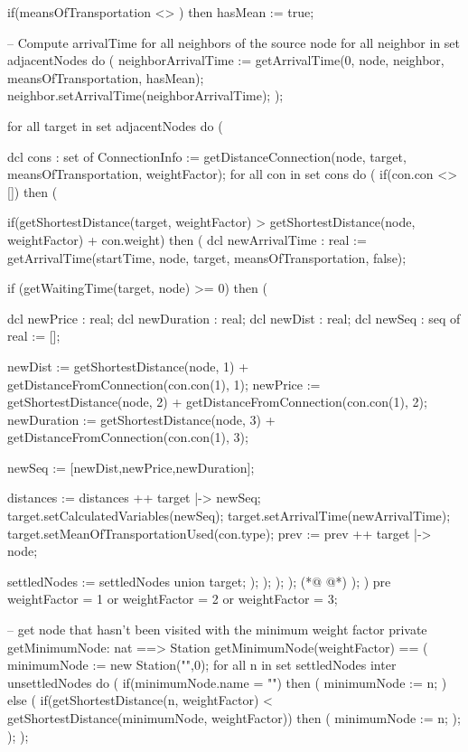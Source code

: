 \begin{vdmpp}[breaklines=true]
  if(meansOfTransportation <> {}) then
    hasMean := true;
    
  -- Compute arrivalTime for all neighbors of the source node
  for all neighbor in set adjacentNodes do (
   neighborArrivalTime := getArrivalTime(0, node, neighbor, meansOfTransportation, hasMean);
   neighbor.setArrivalTime(neighborArrivalTime);
  );

  for all target in set adjacentNodes do (
  
   dcl cons : set of ConnectionInfo := getDistanceConnection(node, target, meansOfTransportation, weightFactor);
   for all con in set cons do (
    if(con.con <> []) then (
    
     if(getShortestDistance(target, weightFactor) > getShortestDistance(node, weightFactor) + con.weight) then (
      dcl newArrivalTime : real := getArrivalTime(startTime, node, target, meansOfTransportation, false);
  
      if (getWaitingTime(target, node) >= 0) then (
      
       dcl newPrice : real;
       dcl newDuration : real;
       dcl newDist : real;
       dcl newSeq : seq of real := [];
      
       newDist := getShortestDistance(node, 1) + getDistanceFromConnection(con.con(1), 1); 
       newPrice := getShortestDistance(node, 2) + getDistanceFromConnection(con.con(1), 2);
       newDuration := getShortestDistance(node, 3) + getDistanceFromConnection(con.con(1), 3); 
      
       newSeq := [newDist,newPrice,newDuration];
       
       distances := distances ++ {target |-> newSeq};
       target.setCalculatedVariables(newSeq);
       target.setArrivalTime(newArrivalTime);
       target.setMeanOfTransportationUsed(con.type);
       prev := prev ++ {target |-> node};
       
       settledNodes := settledNodes union {target}; 
      );
     );
    );
   );
(*@
\label{getMinimumNode:182}
@*)
  );
 )
 pre weightFactor = 1 or weightFactor = 2 or weightFactor = 3;
 
 -- get node that hasn't been visited with the minimum weight factor
 private getMinimumNode: nat ==> Station 
 getMinimumNode(weightFactor) == 
 (
  minimumNode := new Station("",0);
  for all n in set settledNodes inter unsettledNodes do (
   if(minimumNode.name = "") then (
    minimumNode := n;
   )
   else (
    if(getShortestDistance(n, weightFactor) < getShortestDistance(minimumNode, weightFactor)) then (
     minimumNode := n;
    ); 
   );
  );
  

\end{vdmpp}
